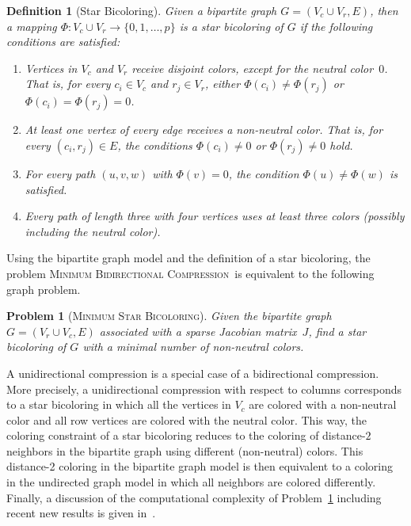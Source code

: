 \documentclass[12pt, twoside,a4paper,toc=bibliography]{scrbook}
\newtheorem{problem}{Problem}
\newtheorem{definition}{Definition}
\newcommand{\MinStaBic}{\textsc{Minimum Star Bicoloring}}
\newcommand{\MinBidCom}{\textsc{Minimum Bidirectional Compression}}
\begin{document}
\begin{definition}[Star Bicoloring]\label{d.coloring}
Given a bipartite graph $G=(V_c\cup V_r, E)$, then a mapping $\Phi:V_c \cup V_r \to
\{0,1,\dots ,p\}$ is a star bicoloring of $G$ if the following conditions are satisfied:
\begin{enumerate}
\item Vertices in $V_c$ and $V_r$ receive disjoint colors, except for the neutral color~$0$. That
is, for every $c_i \in V_c$ and $r_j \in V_r$, either $\Phi(c_i) \neq \Phi(r_j)$ or
$\Phi(c_i)=\Phi(r_j)=0$.

\item At least one vertex of every edge receives a non-neutral color. That is, for every
$(c_i,r_j)\in E$, the conditions $\Phi(c_i)\neq 0$ or $\Phi(r_j)\neq 0$ hold.

\item For every path $(u,v,w)$ with $\Phi(v) = 0$, the condition $\Phi(u)\neq \Phi(w)$ is
satisfied.
\item Every path of length three with four vertices uses at least three colors
(possibly including the neutral color).
\end{enumerate}
\end{definition}

Using the bipartite graph model and the definition of a star bicoloring, the problem
\MinBidCom\ is equivalent to the following graph problem.

\begin{problem}[\MinStaBic]
\label{p.coloring} Given the bipartite graph $G=(V_r\cup V_c, E)$ associated with a sparse Jacobian
matrix~$J$, find a star bicoloring of $G$ with a minimal number of non-neutral colors.
\end{problem}

A unidirectional compression is a special case of a bidirectional compression. More precisely, a
unidirectional compression with respect to columns corresponds to a star bicoloring in which all
the vertices in $V_c$ are colored with a non-neutral color and all row vertices are colored with
the neutral color. This way, the coloring constraint of a star bicoloring reduces to the coloring of
distance-$2$ neighbors in the bipartite graph using different (non-neutral) colors. This distance-2
coloring in the bipartite graph model is then equivalent to a coloring in the undirected graph
model in which all neighbors are colored differently. Finally, a discussion of the computational
complexity of Problem~\ref{p.coloring} including recent new results is given in~\cite{jj:cjr}.
\end{document}
